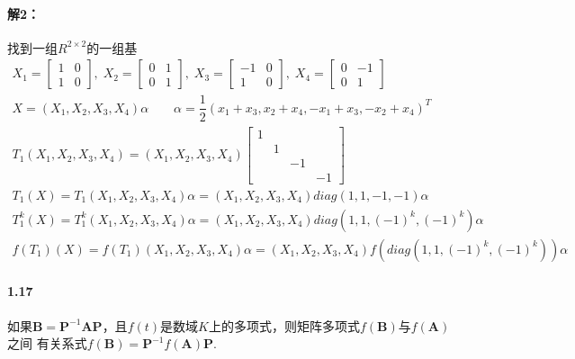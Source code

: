 \documentclass[12pt, a4paper, oneside, fontset=none]{ctexart}
\begin{document}
\paragraph*{解2：}
找到一组$R^{2\times 2}$的一组基
\begin{gather*}
    X_1 = \begin{bmatrix}
        1 & 0 \\
        1 & 0
    \end{bmatrix}, \; X_2 = \begin{bmatrix}
        0 & 1 \\
        0 & 1
    \end{bmatrix}, \; X_3 = \begin{bmatrix}
        -1 & 0 \\
        1  & 0
    \end{bmatrix}, \; X_4 = \begin{bmatrix}
        0 & -1 \\
        0 & 1
    \end{bmatrix} \\
    X = (X_1, X_2, X_3, X_4)\alpha \qquad \alpha = \dfrac{1}{2}(x_1 + x_3, x_2 + x_4, -x_1 + x_3, -x_2 + x_4)^T \\
    T_1(X_1, X_2, X_3, X_4) = (X_1, X_2, X_3, X_4) \begin{bmatrix}
        1 &   &    &    \\
          & 1 &    &    \\
          &   & -1 &    \\
          &   &    & -1
    \end{bmatrix} \\
    T_1(X) = T_1(X_1, X_2, X_3, X_4)\alpha = (X_1, X_2, X_3, X_4) diag(1,1,-1,-1)\alpha \\
    T_1^k(X) = T_1^k(X_1, X_2, X_3, X_4)\alpha = (X_1, X_2, X_3, X_4)diag(1,1,(-1)^k,(-1)^k)\alpha \\
    f(T_1)(X) = f(T_1)(X_1, X_2, X_3, X_4)\alpha = (X_1, X_2, X_3, X_4)f(diag(1,1,(-1)^k,(-1)^k))\alpha
\end{gather*}

\paragraph*{1.17} 如果$\bm{B} = \bm{P}^{-1} \bm{AP}$，且$f(t)$是数域$K$上的多项式，则矩阵多项式$f(\bm{B})$与$f(\bm{A})$之间
有关系式$f(\bm{B})  = \bm{P}^{-1}f(\bm{A}) \bm{P}$.
\end{document}
